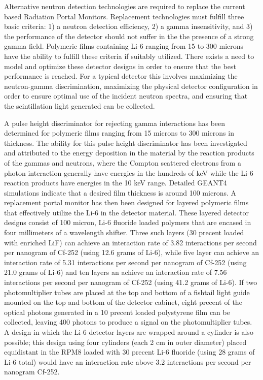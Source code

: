 Alternative neutron detection technologies are required to replace the current  based Radiation Portal Monitors.
Replacement technologies must fulfill three basic criteria: 1) a neutron detection efficiency, 2) a gamma insensitivity, and 3) the performance of the detector should not suffer in the the presence of a strong gamma field.
Polymeric films containing Li-6 ranging from 15 to 300 microns have the ability to fulfill these criteria if suitably utilized.
There exists a need to model and optimize these detector designs in order to ensure that the best performance is reached. 
For a typical detector this involves maximizing the neutron-gamma discrimination, maximizing the physical detector configuration in order to ensure optimal use of the incident neutron spectra, and ensuring that the scintillation light generated can be collected.

A pulse height discriminator for rejecting gamma interactions has been determined for polymeric films  ranging from 15 microns to 300 microns in thickness.
The ability for this pulse height discriminator has been investigated and attributed to the  energy deposition in the material by the reaction products of the gammas and neutrons, where the Compton scattered electrons from a photon interaction generally have energies in the hundreds of keV while the Li-6 reaction products have energies in the 10 keV range. 
Detailed GEANT4 simulations indicate that a desired film thickness is around 100 microns.
A replacement portal monitor has then been designed for layered polymeric films that effectively utilize the Li-6 in the detector material.
These layered detector designs consist of 100 micron, Li-6 fluoride loaded polymers that are encased in four millimeters of a wavelength shifter.
Three such layers (30 precent loaded with enriched LiF) can achieve an interaction rate of 3.82 interactions per second per nanogram of Cf-252 (using 12.6 grams of Li-6), while five layer can achieve an interaction rate of 5.31 interactions per second per nanogram of Cf-252 (using 21.0 grams of Li-6)  and ten layers an achieve an interaction rate of 7.56 interactions per second per nanogram of Cf-252 (using 41.2 grams of Li-6).
If two photomultiplier tubes are placed at the top and bottom of a fishtail light guide mounted on the top and bottom of the detector cabinet, eight precent of the optical photons generated in a 10 precent loaded polystyrene film can be collected, leaving 400 photons to produce a signal on the photomultiplier tubes.
A design in which the Li-6 detector layers are wrapped around a cylinder is also possible; this design using four cylinders (each 2 cm in outer diameter) placed equidistant in the RPM8 loaded with 30 precent Li-6 fluoride (using 28 grams of Li-6 total) would have an interaction rate above 3.2 interactions per second per nanogram Cf-252.